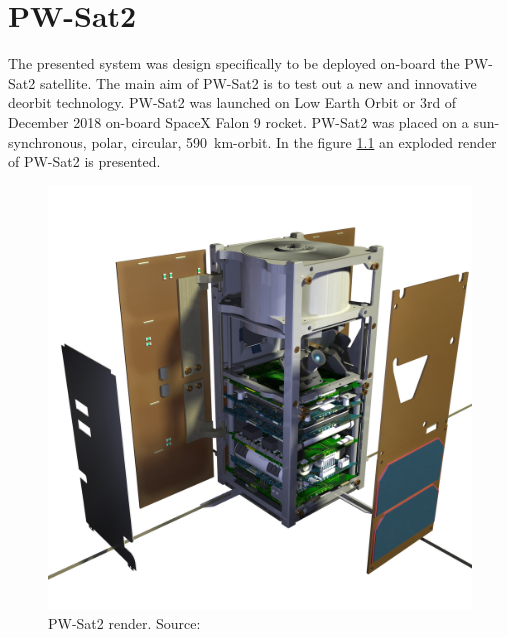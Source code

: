 \chapter{PW-Sat2}
The presented system was design specifically to be deployed on-board the PW-Sat2 satellite.  The main aim of PW-Sat2 is to test out a new and innovative deorbit technology. PW-Sat2 was launched on Low Earth Orbit or 3rd of December 2018 on-board SpaceX Falon 9 rocket. PW-Sat2 was placed on a sun-synchronous, polar, circular, \SI{590}{\kilo\meter}-orbit.
In the figure \ref{PW-Sat_render_01} an exploded render of PW-Sat2 is presented.
\begin{figure}
    \centering
    \includegraphics[width=0.65\paperwidth]{img/3/PW-Sat2_render_01.png}
    \caption{PW-Sat2 render. Source: \cite{PW_sat2_photo}}
    \label{PW-Sat_render_01}
\end{figure}


